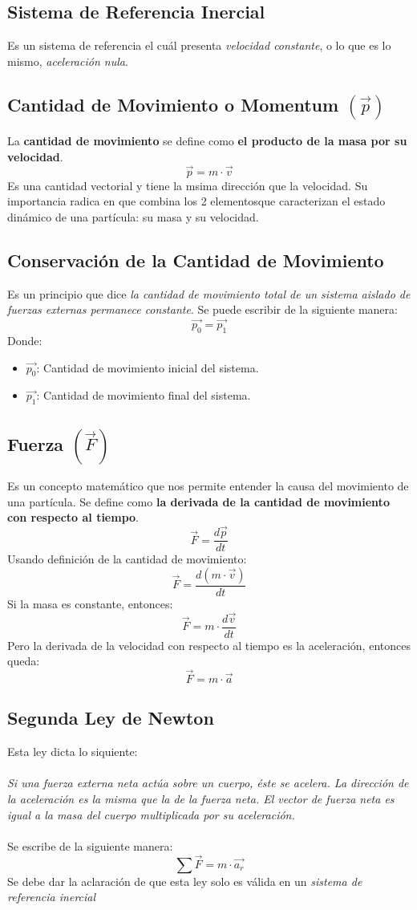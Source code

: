 \documentclass[../main.tex]{subfiles}
\begin{document}
\subsection{Sistema de Referencia Inercial}
Es un sistema de referencia el cuál presenta \textit{velocidad constante}, o lo que es lo mismo, \textit{aceleración nula}.
\subsection{Cantidad de Movimiento o Momentum \( ( \overrightarrow{p} ) \)}
La \textbf{cantidad de movimiento} se define como \textbf{el producto de la masa por su velocidad}.\cite{finn}
\[ \vec{p} = m \cdot \vec{v} \]
Es una cantidad vectorial y tiene la msima dirección que la velocidad. Su importancia radica en que combina los 2 elementosque caracterizan el estado dinámico de una partícula: su masa y su velocidad.\cite{finn}
\subsection{Conservación de la Cantidad de Movimiento}
Es un principio que dice \textit{la cantidad de movimiento total de un sistema aislado de fuerzas externas permanece constante}.
Se puede escribir de la siguiente manera:\cite{finn}
\[ \vec{p_{0}} = \vec{p_{1}} \]
Donde:
\begin{itemize}
    \item \(\vec{p_{0}}\): Cantidad de movimiento inicial del sistema.
    \item \(\vec{p_{1}}\): Cantidad de movimiento final del sistema.
\end{itemize}
\subsection{Fuerza  \( ( \overrightarrow{F} ) \)}
Es un concepto matemático que nos permite entender la causa del movimiento de una partícula. Se define como \textbf{la derivada de la cantidad de movimiento con respecto al tiempo}.\cite{finn}
\[ \vec{F} = \frac{d \vec{p}}{dt} \]
Usando definición de la cantidad de movimiento:
\[ \vec{F} = \frac{d  (m \cdot \vec{v}) }{dt} \]
Si la masa es constante, entonces:
\[ \vec{F} = m \cdot \frac{d \vec{v} }{dt} \]
Pero la derivada de la velocidad con respecto al tiempo es la aceleración, entonces queda:
\[ \vec{F}  = m \cdot \vec{a} \]

\subsection{Segunda Ley de Newton}
Esta ley dicta lo siquiente: \\ \\
\textit{Si una fuerza externa neta actúa sobre un cuerpo, éste se acelera. La dirección de la aceleración es la misma 
que la de la fuerza neta. El vector de fuerza neta es igual a la masa del cuerpo 
multiplicada por su aceleración.} \cite{sears} \\ \\
Se escribe de la siguiente manera:
\[ \sum \vec{F}  = m \cdot \vec{a_r} \]
Se debe dar la aclaración de que esta ley solo es válida en un \textit{sistema de referencia inercial}
\end{document}
